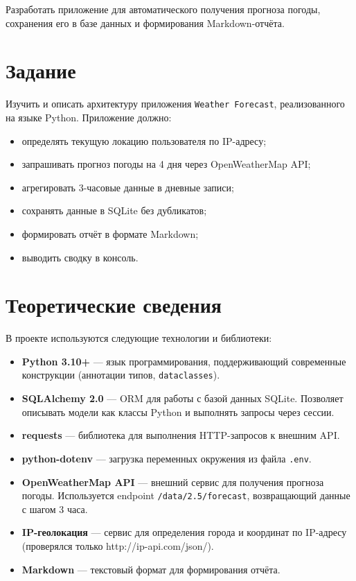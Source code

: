 \documentclass[11pt,a4paper]{article}
\begin{document}
Разработать приложение для автоматического получения прогноза погоды, сохранения его в базе данных и формирования Markdown-отчёта.

\section*{\normalsize Задание}

Изучить и описать архитектуру приложения \texttt{Weather Forecast}, реализованного на языке Python. Приложение должно:
\begin{itemize}
    \item определять текущую локацию пользователя по IP-адресу;
    \item запрашивать прогноз погоды на 4 дня через OpenWeatherMap API;
    \item агрегировать 3-часовые данные в дневные записи;
    \item сохранять данные в SQLite без дубликатов;
    \item формировать отчёт в формате Markdown;
    \item выводить сводку в консоль.
\end{itemize}

\section*{\normalsize Теоретические сведения}

В проекте используются следующие технологии и библиотеки:
\begin{itemize}
    \item \textbf{Python 3.10+} --- язык программирования, поддерживающий современные конструкции (аннотации типов, \texttt{dataclasses}).
    \item \textbf{SQLAlchemy 2.0} --- ORM для работы с базой данных SQLite. Позволяет описывать модели как классы Python и выполнять запросы через сессии.
    \item \textbf{requests} --- библиотека для выполнения HTTP-запросов к внешним API.
    \item \textbf{python-dotenv} --- загрузка переменных окружения из файла \texttt{.env}.
    \item \textbf{OpenWeatherMap API} --- внешний сервис для получения прогноза погоды. Используется endpoint \texttt{/data/2.5/forecast}, возвращающий данные с шагом 3 часа.
    \item \textbf{IP-геолокация} --- сервис для определения города и координат по IP-адресу (проверялся только http://ip-api.com/json/).
    \item \textbf{Markdown} --- текстовый формат для формирования отчёта.
\end{itemize}
\end{document}
